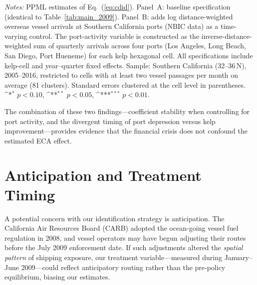 \documentclass[12pt]{article}
\providecommand{\sym}[1]{\ifmmode^{#1}\else\(^{#1}\)\fi}
\begin{document}
\begin{table}[H]
  \centering
  \caption{Robustness to controlling for port economic activity}
  \label{tab:crisis_robustness}
  
  \vspace{0.5em}

  \begin{minipage}{\linewidth}
  \footnotesize
  \textit{Notes:} PPML estimates of Eq.~(\ref{eq:cdid}). Panel~A: baseline specification (identical to Table~\ref{tab:main_2009}). Panel~B: adds log distance-weighted overseas vessel arrivals at Southern California ports (NBIC data) as a time-varying control. The port-activity variable is constructed as the inverse-distance-weighted sum of quarterly arrivals across four ports (Los Angeles, Long Beach, San Diego, Port Hueneme) for each kelp hexagonal cell. All specifications include kelp-cell and year--quarter fixed effects. Sample: Southern California (32\textdegree--36\textdegree\,N), 2005--2016, restricted to cells with at least two vessel passages per month on average (81 clusters). Standard errors clustered at the cell level in parentheses.\\
  \sym{*} \(p<0.10\), \sym{**} \(p<0.05\), \sym{***} \(p<0.01\).
  \end{minipage}
\end{table}

The combination of these two findings---coefficient stability when controlling for port activity, and the divergent timing of port depression versus kelp improvement---provides evidence that the financial crisis does not confound the estimated ECA effect.

\newpage

\section{Anticipation and Treatment Timing}\label{appendix_anticipation}

A potential concern with our identification strategy is anticipation. The California Air Resources Board (CARB) adopted the ocean-going vessel fuel regulation in 2008, and vessel operators may have begun adjusting their routes before the July 2009 enforcement date. If such adjustments altered the \emph{spatial pattern} of shipping exposure, our treatment variable---measured during January--June 2009---could reflect anticipatory routing rather than the pre-policy equilibrium, biasing our estimates.
\end{document}
